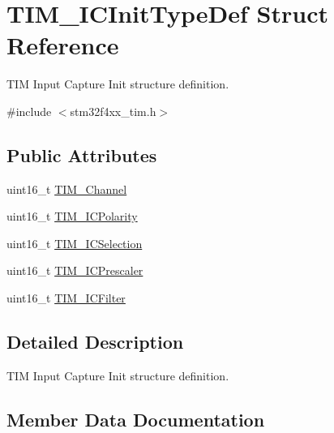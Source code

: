 \hypertarget{struct_t_i_m___i_c_init_type_def}{}\section{T\+I\+M\+\_\+\+I\+C\+Init\+Type\+Def Struct Reference}
\label{struct_t_i_m___i_c_init_type_def}


T\+IM Input Capture Init structure definition.  




{\ttfamily \#include $<$stm32f4xx\+\_\+tim.\+h$>$}

\subsection*{Public Attributes}
\begin{DoxyCompactItemize}
\item 
uint16\+\_\+t \hyperlink{struct_t_i_m___i_c_init_type_def_ab9404ee3d95aaa7a478ed99562c736d2}{T\+I\+M\+\_\+\+Channel}
\item 
uint16\+\_\+t \hyperlink{struct_t_i_m___i_c_init_type_def_a234c284efc36c0cc15a2ed0fb4435557}{T\+I\+M\+\_\+\+I\+C\+Polarity}
\item 
uint16\+\_\+t \hyperlink{struct_t_i_m___i_c_init_type_def_a00b9a72e895a43dc18c69c96a149f080}{T\+I\+M\+\_\+\+I\+C\+Selection}
\item 
uint16\+\_\+t \hyperlink{struct_t_i_m___i_c_init_type_def_ac61c7fc999ace295ac81b304cabd61e0}{T\+I\+M\+\_\+\+I\+C\+Prescaler}
\item 
uint16\+\_\+t \hyperlink{struct_t_i_m___i_c_init_type_def_a72539caa6e965e4fa89e3b21b188cf26}{T\+I\+M\+\_\+\+I\+C\+Filter}
\end{DoxyCompactItemize}


\subsection{Detailed Description}
T\+IM Input Capture Init structure definition. 

\subsection{Member Data Documentation}
